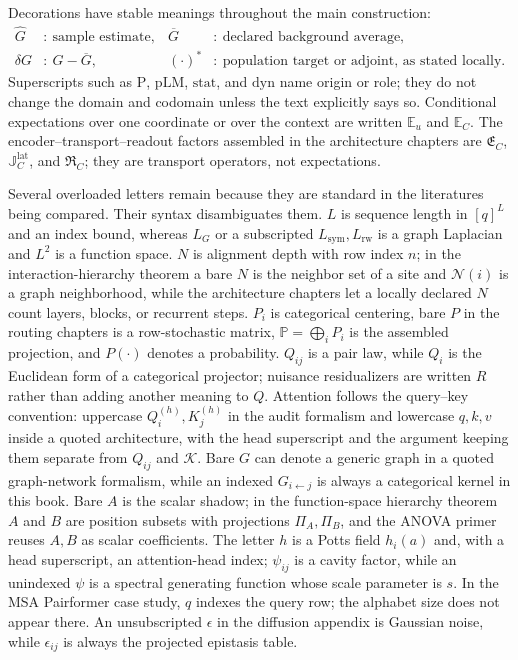 Decorations have stable meanings throughout the main construction:
\begin{equation*}
\begin{aligned}
\widehat G&:\ \text{sample estimate}, &
\overline G&:\ \text{declared background average},\\
\delta G&:\ G-\overline G, &
(\cdot)^*&:\ \text{population target or adjoint, as stated locally}.
\end{aligned}
\end{equation*}
Superscripts such as ${\mathrm P}$, ${\mathrm{pLM}}$, ${\mathrm{stat}}$, and ${\mathrm{dyn}}$
name origin or role; they do not change the domain and codomain unless the text explicitly says so.
Conditional expectations over one coordinate or over the context are written $\mathbb E_u$ and
$\mathbb E_C$.  The encoder--transport--readout factors assembled in the architecture chapters are
$\mathfrak E_C$, $\mathbb J_C^{\mathrm{lat}}$, and $\mathfrak R_C$; they are transport operators,
not expectations.

Several overloaded letters remain because they are standard in the literatures being compared.  Their
syntax disambiguates them.  $L$ is sequence length in $[q]^L$ and an index bound, whereas $L_G$ or a
subscripted $L_{\mathrm{sym}},L_{\mathrm{rw}}$ is a graph Laplacian and $L^2$ is a function space.
$N$ is alignment depth with row index $n$; in the interaction-hierarchy theorem a bare $N$ is the
neighbor set of a site and $\mathcal N(i)$ is a graph neighborhood, while the architecture chapters
let a locally declared $N$ count layers, blocks, or recurrent steps.  $P_i$ is categorical
centering, bare $P$ in the routing chapters is a row-stochastic matrix, $\mathbb P=\bigoplus_iP_i$
is the assembled projection, and $P(\cdot)$ denotes a probability.  $Q_{ij}$ is a pair law, while
$Q_i$ is the Euclidean form of a categorical projector; nuisance residualizers are written $R$
rather than adding another meaning to $Q$.  Attention follows the query--key convention: uppercase
$Q_i^{(h)},K_j^{(h)}$ in the audit formalism and lowercase $q,k,v$ inside a quoted architecture,
with the head superscript and the argument keeping them separate from $Q_{ij}$ and $\mathcal K$.
Bare $G$ can denote a generic graph in a quoted graph-network formalism, while an indexed
$G_{i\leftarrow j}$ is always a categorical kernel in this book.  Bare $A$ is the scalar shadow; in
the function-space hierarchy theorem $A$ and $B$ are position subsets with projections
$\Pi_A,\Pi_B$, and the ANOVA primer reuses $A,B$ as scalar coefficients.  The letter $h$ is a Potts
field $h_i(a)$ and, with a head superscript, an attention-head index; $\psi_{ij}$ is a cavity
factor, while an unindexed $\psi$ is a spectral generating function whose scale parameter is $s$.
In the MSA Pairformer case study, $q$ indexes the query row; the alphabet size does not appear
there.  An unsubscripted $\epsilon$ in the diffusion appendix is Gaussian noise, while
$\epsilon_{ij}$ is always the projected epistasis table.


